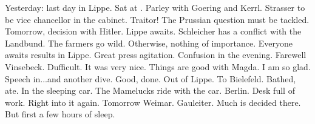 Yesterday: last day in Lippe. Sat at . Parley with Goering and Kerrl. Strasser to be vice chancellor in the cabinet. Traitor! The Prussian question must be tackled. Tomorrow, decision with Hitler. Lippe awaits. Schleicher has a conflict with the Landbund. The farmers go wild. Otherwise, nothing of importance. Everyone awaits results in Lippe. Great press agitation. Confusion in the evening. Farewell Vinsebeck. Dufficult. It was very nice. Things are good with Magda. I am so glad. Speech in...and another dive. Good, done. Out of Lippe. To Bielefeld. Bathed, ate. In the sleeping car. The Mamelucks ride with the car. Berlin. Desk full of work. Right into it again. Tomorrow Weimar. Gauleiter. Much is decided there. But first a few hours of sleep.